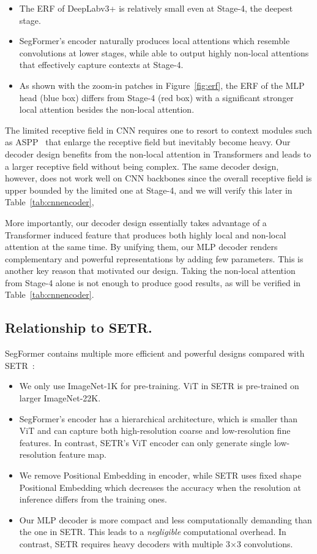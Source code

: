 \begin{itemize}[leftmargin=*]
    \item The ERF of DeepLabv3+ is relatively small even at Stage-4, the deepest stage.
    \item SegFormer's encoder naturally produces local attentions which resemble convolutions at lower stages, while able to output highly non-local attentions that effectively capture contexts at Stage-4.
    \item As shown with the zoom-in patches in Figure~\ref{fig:erf}, the ERF of the MLP head (blue box) differs from Stage-4 (red box) with a significant stronger local attention besides the non-local attention.
\end{itemize}

The limited receptive field in CNN requires one to resort to context modules such as ASPP~\cite{denseaspp} that enlarge the receptive field but inevitably become heavy. Our decoder design benefits from the non-local attention in Transformers and leads to a larger receptive field without being complex. The same decoder design, however, does not work well on CNN backbones since the overall receptive field is upper bounded by the limited one at Stage-4, and we will verify this later in Table~\ref{tab:cnnencoder},

More importantly, our decoder design essentially takes advantage of a Transformer induced feature that produces both highly local and non-local attention at the same time. By unifying them, our MLP decoder renders complementary and powerful representations by adding few parameters. This is another key reason that motivated our design. Taking the non-local attention from Stage-4 alone is not enough to produce good results, as will be verified in Table~\ref{tab:cnnencoder}.

\subsection{Relationship to SETR.} SegFormer contains multiple more efficient and powerful designs compared with SETR~\cite{setr}:

\begin{itemize}[leftmargin=*]
\item We only use ImageNet-1K for pre-training. ViT in SETR is pre-trained on larger ImageNet-22K. 
\item SegFormer's encoder has a hierarchical architecture, which is smaller than ViT and can capture both high-resolution coarse and low-resolution fine features. In contrast, SETR's ViT encoder can only generate single low-resolution feature map.
\item We remove Positional Embedding in encoder, while SETR uses fixed shape Positional Embedding which decreases the accuracy when the resolution at inference differs from the training ones. 
\item Our MLP decoder is more compact and less computationally demanding than the one in SETR. This leads to a \textit{negligible} computational overhead. In contrast, SETR requires heavy decoders with multiple 3$\times$3 convolutions.  
\end{itemize}

